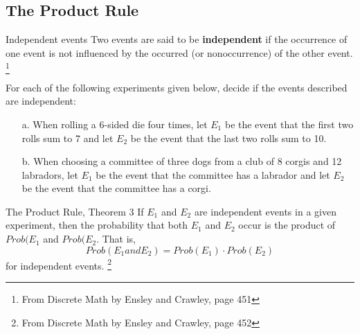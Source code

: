 {    \newpage

    \subsection{The Product Rule}
        \begin{intro}{Independent events}
            Two events are said to be \textbf{independent} if the occurrence
            of one event is not influenced by the occurred (or nonoccurrence)
            of the other event.
            \footnote{From Discrete Math by Ensley and Crawley, page 451}
        \end{intro}
    
    \begin{questionNOGRADE}{\thequestion}
        For each of the following experiments given below,
        decide if the events described are independent:

        \begin{itemize}
            \item[a.] When rolling a 6-sided die four times, let $E_{1}$
                be the event that the first two rolls sum to 7 and let $E_{2}$
                be the event that the last two rolls sum to 10. ~\\ \vspace{1cm}

            \item[b.] When choosing a committee of three dogs from a club of
                8 corgis and 12 labradors, let $E_{1}$ be the event that
                the committee has a labrador and let $E_{2}$ be the
                event that the committee has a corgi. ~\\ \vspace{1cm}
        \end{itemize}        
    \end{questionNOGRADE}

    \newpage

    \begin{intro}{The Product Rule, Theorem 3}
        If $E_{1}$ and $E_{2}$ are independent events in a given
        experiment, then the probability that both $E_{1}$ and $E_{2}$
        occur is the product of $Prob(E_{1}$ and $Prob(E_{2}$. That is,
        $$ Prob(E_{1} and E_{2}) = Prob(E_{1}) \cdot Prob(E_{2}) $$
        for independent events.
        \footnote{From Discrete Math by Ensley and Crawley, page 452}
    \end{intro}


}
